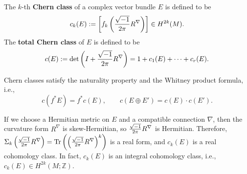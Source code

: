 \begin{definition}
    The $k$-th \textbf{Chern class} of a complex vector bundle $E$ is defined to be 
    \begin{equation*}
        c_k(E) := \left[f_k\left(\frac{\sqrt{-1}}{2\pi}R^\nabla\right)\right] \in H^{2k}(M).
    \end{equation*}
    The \textbf{total Chern class} of $E$ is defined to be
    \begin{equation*}
        c(E) := \det\left(I + \frac{\sqrt{-1}}{2\pi}R^\nabla\right) = 1 + c_1(E) + \cdots + c_r(E).
    \end{equation*}
\end{definition}
\begin{proposition}
    Chern classes satisfy the naturality property and the Whitney product formula, i.e.,
    \begin{equation*}
        c(f^*E) = f^*c(E), \qquad c(E\oplus E') = c(E)\cdot c(E').
    \end{equation*}
\end{proposition}
\begin{remark}
    If we choose a Hermitian metric on $E$ and a compatible connection $\nabla$, 
    then the curvature form $R^\nabla$ is skew-Hermitian, 
    so $\frac{\sqrt{-1}}{2\pi}R^\nabla$ is Hermitian. Therefore, 
    $\Sigma_k\left(\frac{\sqrt{-1}}{2\pi}R^\nabla\right) = {\rm Tr}\left(\left(\frac{\sqrt{-1}}{2\pi}R^\nabla\right)^k\right)$ 
    is a real form, and $c_k(E)$ is a real cohomology class. 
    In fact, $c_k(E)$ is an integral cohomology class, i.e., $c_k(E)\in H^{2k}(M;\mathbb{Z})$.
\end{remark}

